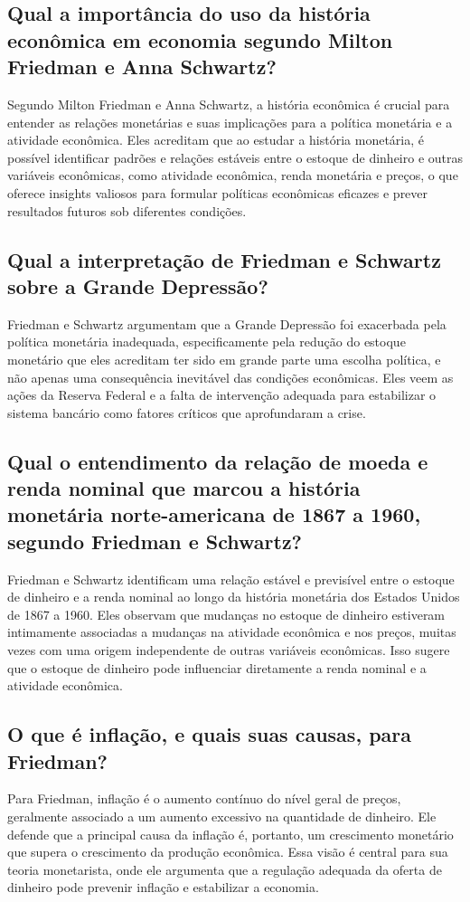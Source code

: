 \documentclass[a4paper,12pt]{article}[abntex2]
\begin{document}
\subsection{\textbf{Qual a importância do uso da história econômica em economia segundo Milton Friedman e Anna Schwartz?}}
Segundo Milton Friedman e Anna Schwartz, a história econômica é crucial para entender as relações monetárias e suas implicações para a política monetária e a atividade econômica. Eles acreditam que ao estudar a história monetária, é possível identificar padrões e relações estáveis entre o estoque de dinheiro e outras variáveis econômicas, como atividade econômica, renda monetária e preços, o que oferece insights valiosos para formular políticas econômicas eficazes e prever resultados futuros sob diferentes condições.

\subsection{\textbf{Qual a interpretação de Friedman e Schwartz sobre a Grande Depressão?}}
Friedman e Schwartz argumentam que a Grande Depressão foi exacerbada pela política monetária inadequada, especificamente pela redução do estoque monetário que eles acreditam ter sido em grande parte uma escolha política, e não apenas uma consequência inevitável das condições econômicas. Eles veem as ações da Reserva Federal e a falta de intervenção adequada para estabilizar o sistema bancário como fatores críticos que aprofundaram a crise.

\subsection{\textbf{Qual o entendimento da relação de moeda e renda nominal que marcou a história monetária norte-americana de 1867 a 1960, segundo Friedman e Schwartz?}}
Friedman e Schwartz identificam uma relação estável e previsível entre o estoque de dinheiro e a renda nominal ao longo da história monetária dos Estados Unidos de 1867 a 1960. Eles observam que mudanças no estoque de dinheiro estiveram intimamente associadas a mudanças na atividade econômica e nos preços, muitas vezes com uma origem independente de outras variáveis econômicas. Isso sugere que o estoque de dinheiro pode influenciar diretamente a renda nominal e a atividade econômica.

\subsection{\textbf{O que é inflação, e quais suas causas, para Friedman?}}
Para Friedman, inflação é o aumento contínuo do nível geral de preços, geralmente associado a um aumento excessivo na quantidade de dinheiro. Ele defende que a principal causa da inflação é, portanto, um crescimento monetário que supera o crescimento da produção econômica. Essa visão é central para sua teoria monetarista, onde ele argumenta que a regulação adequada da oferta de dinheiro pode prevenir inflação e estabilizar a economia.
\end{document}
